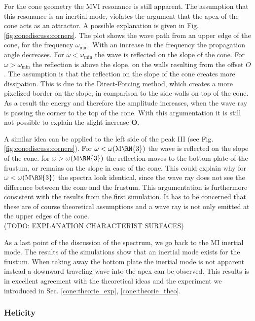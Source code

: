 
For the cone geometry the M\RN{6} resonance is still apparent.
The assumption that this resonance is an inertial mode,
violates the argument that the apex of the cone acts as
an attractor.
A possible explanation is given in Fig. \ref{fig:conediscuss:corners}.
The plot shows the wave path from an upper edge of the cone, for the frequency $\omega_{\text{min}}$.
With an increase in the frequency the propagation angle decreases.
For $\omega<\omega_{\text{min}}$ the wave is reflected on the slope of the cone.
For $\omega>\omega_{\text{min}}$ the reflection is above the slope, on the walls resulting from the offset $O$.
The assumption is that the reflection on the slope of the cone creates more dissipation.
This is due to the Direct-Forcing method, which creates a more pixelized border on the slope,
in comparison to the side walls on top of the cone.
As a result the energy and therefore the amplitude increases,
when the wave ray is passing the corner to the top of the cone.
With this argumentation it is still not possible to explain the slight increase \textbf{O}.


A similar idea can be applied to the left side of the peak \RN{3} (see Fig. \ref{fig:conediscuss:corners}).
For $\omega<\omega(\text{M\RN{3}})$ the wave is reflected on the slope of the cone.
for  $\omega>\omega(\text{M\RN{3}})$ the reflection moves to the bottom plate of the frustum,
or remains on the slope in case of the cone.
This could explain why for   $\omega<\omega(\text{M\RN{3}})$  the spectra look identical,
since the wave ray does not see the difference between the cone and the frustum.
This argumentation is furthermore consistent with the results from the first simulation.
It has to be concerned that these are of course theoretical assumptions and a wave ray is not only emitted at the
upper edges of the cone.\\ (TODO: EXPLANATION CHARACTERIST SURFACES)

As a last point of the discussion of the spectrum, we go back to the M\RN{1} inertial mode.
The results of the simulations show that an inertial mode exists for the frustum.
When taking away the bottom plate the inertial mode is not apparent instead
a downward traveling wave into the apex can be observed.
This results is in excellent agreement with the theoretical ideas and the experiment we introduced in Sec.
\ref{cone:theorie_exp}, \ref{cone:theorie_theo}.
\clearpage
\subsubsection{Helicity}

